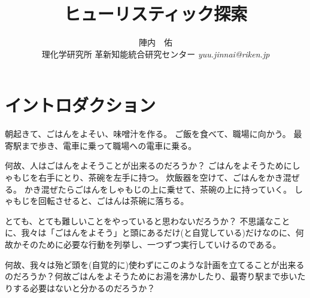 \documentclass[b5paper]{report}
\title{ヒューリスティック探索}
\author{陣内　佑 \\
理化学研究所 革新知能統合研究センター
{\it yuu.jinnai@riken.jp}}
\begin{document}
\maketitle
\listoftodos
\tableofcontents

\newpage

\chapter{イントロダクション}
\label{ch:introduction}

朝起きて、ごはんをよそい、味噌汁を作る。
ご飯を食べて、職場に向かう。
最寄駅まで歩き、電車に乗って職場への電車に乗る。

何故、人はごはんをよそうことが出来るのだろうか？
ごはんをよそうためにしゃもじを右手にとり、茶碗を左手に持つ。
炊飯器を空けて、ごはんをかき混ぜる。
かき混ぜたらごはんをしゃもじの上に乗せて、茶碗の上に持っていく。
しゃもじを回転させると、ごはんは茶碗に落ちる。

とても、とても難しいことをやっていると思わないだろうか？
不思議なことに、我々は「ごはんをよそう」と頭にあるだけ(と自覚している)だけなのに、何故かそのために必要な行動を列挙し、一つずつ実行していけるのである。

何故、我々は殆ど頭を(自覚的に)使わずにこのような計画を立てることが出来るのだろうか？何故ごはんをよそうためにお湯を沸かしたり、最寄り駅まで歩いたりする必要はないと分かるのだろうか？
\end{document}
